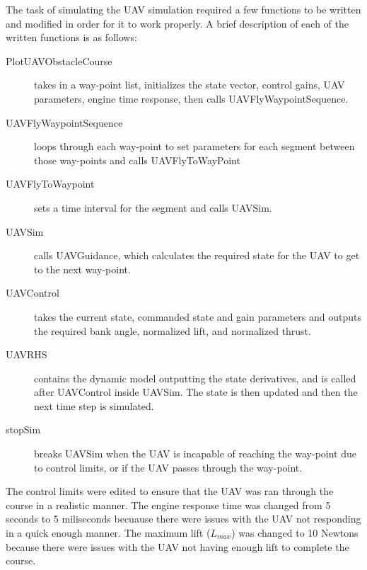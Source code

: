 \documentclass[12pt]{article}
\begin{document}
The task of simulating the UAV simulation required a few functions to be written and modified in order for it to work properly. A brief description of each of the written functions is as follows: 
\begin{description}
	\item[PlotUAVObstacleCourse] takes in a way-point list, initializes the state vector, control gains, UAV parameters, engine time response, then calls UAVFlyWaypointSequence.
	\item[UAVFlyWaypointSequence] loops through each way-point to set parameters for each segment between those way-points and calls UAVFlyToWayPoint
	\item[UAVFlyToWaypoint] sets a time interval for the segment and calls 
	UAVSim. 
	\item[UAVSim] calls UAVGuidance, which calculates the required state for the UAV to get to the next way-point. 
	\item[UAVControl] takes the current state, commanded state and gain parameters and outputs the required bank angle, normalized lift, and normalized thrust.
	\item[UAVRHS] contains the dynamic model outputting the state derivatives, and is called after UAVControl inside UAVSim. The state is then updated and then the next time step is simulated. 
	\item[stopSim] breaks UAVSim when the UAV is incapable of reaching the way-point due to control limits, or if the UAV passes through the way-point. 
\end{description}

The control limits were edited to ensure that the UAV was ran through the course in a realistic manner. The engine response time was changed from 5 seconds to 5 miliseconds becuause there were issues with the UAV not responding in a quick enough manner. The maximum lift ($L_{max}$) was changed to 10 Newtons because there were issues with the UAV not having enough lift to complete the course. 
\end{document}
